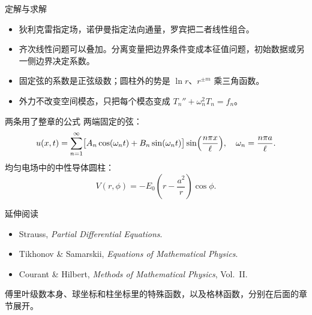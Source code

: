 \documentclass[fontset=windows, chinese, 10pt, xcolor=dvipsnames]{beamer}
\begin{document}
\begin{frame}{定解与求解}
  \begin{itemize}
    \item 狄利克雷指定场，诺伊曼指定法向通量，罗宾把二者线性组合。
    \item 齐次线性问题可以叠加。分离变量把边界条件变成本征值问题，初始数据或另一侧边界决定系数。
    \item 固定弦的系数是正弦级数；圆柱外的势是 $\ln r$、$r^{\pm m}$ 乘三角函数。
    \item 外力不改变空间模态，只把每个模态变成 $T_n''+\omega_n^2 T_n=f_n$。
  \end{itemize}
\end{frame}

\begin{frame}{两条用了整章的公式}
  两端固定的弦：
  \begin{equation*}
    u(x,t)=\sum_{n=1}^{\infty}
    \bigl[A_n\cos(\omega_n t)+B_n\sin(\omega_n t)\bigr]
    \sin\Bigl(\frac{n\pi x}{\ell}\Bigr),
    \quad \omega_n=\frac{n\pi a}{\ell}.
  \end{equation*}
  均匀电场中的中性导体圆柱：
  \begin{equation*}
    V(r,\phi)=-E_0\left(r-\frac{a^2}{r}\right)\cos\phi.
  \end{equation*}
\end{frame}

\begin{frame}{延伸阅读}
  \begin{itemize}
    \item Strauss, \textit{Partial Differential Equations}.
    \item Tikhonov \& Samarskii, \textit{Equations of Mathematical Physics}.
    \item Courant \& Hilbert, \textit{Methods of Mathematical Physics}, Vol.~II.
  \end{itemize}
  \vspace{0.6em}
  傅里叶级数本身、球坐标和柱坐标里的特殊函数，以及格林函数，分别在后面的章节展开。
\end{frame}
\end{document}
